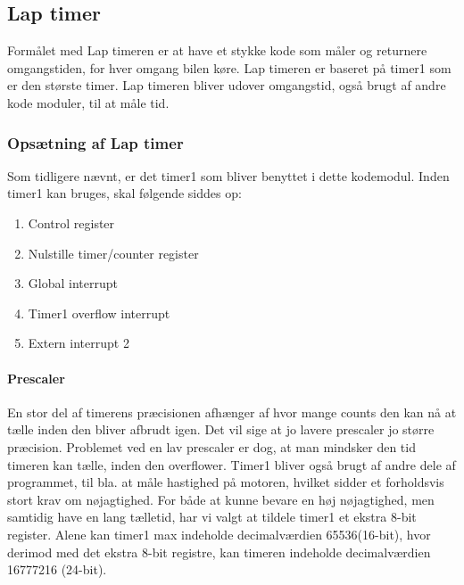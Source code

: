 \newpage


\subsection{Lap timer}
\label{lapt}
Formålet med Lap timeren er at have et stykke kode som måler og returnere omgangstiden, for hver omgang bilen køre. Lap timeren er baseret på timer1 som er den største timer. Lap timeren bliver udover omgangstid, også brugt af andre kode moduler, til at måle tid.
\subsubsection{Opsætning af Lap timer}
Som tidligere nævnt, er det timer1 som bliver benyttet i dette kodemodul. Inden timer1 kan bruges, skal følgende siddes op:
\begin{enumerate}
\item Control register
\item Nulstille timer/counter register
\item Global interrupt
\item Timer1 overflow interrupt
\item Extern interrupt 2
\end{enumerate}

\paragraph{Prescaler}
En stor del af timerens præcisionen afhænger af hvor mange counts den kan nå at tælle inden den bliver afbrudt igen. Det vil sige at jo lavere prescaler jo større præcision. Problemet ved en lav prescaler er dog, at man mindsker den tid timeren kan tælle, inden den overflower. Timer1 bliver også brugt af andre dele af programmet, til bla. at måle hastighed på motoren, hvilket sidder et forholdsvis stort krav om nøjagtighed. For både at kunne bevare en høj nøjagtighed, men samtidig have en lang tælletid, har vi valgt at tildele timer1 et ekstra 8-bit register. Alene kan timer1 max indeholde decimalværdien 65536(16-bit), hvor derimod med det ekstra 8-bit registre, kan timeren indeholde decimalværdien 16777216 (24-bit).\\

